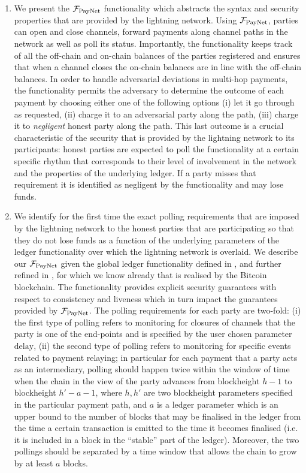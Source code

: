\begin{enumerate}
\item We present the $\mathcal{F}_{\mathrm{PayNet}}{}$ functionality which abstracts the syntax and
security properties that are provided by the lightning network. 
Using  $\mathcal{F}_{\mathrm{PayNet}}{}$, parties can open and close channels, forward
payments along channel paths in the network as well as poll its status. 
Importantly, the functionality keeps track of all the off-chain and on-chain
balances
of the  parties registered  and ensures that when a channel closes
the on-chain balances are in line with the off-chain balances.
In order to handle adversarial deviations in multi-hop payments, 
the functionality
permits the adversary to determine the outcome of each payment
by choosing either one of the following options (i) let it go through
as requested, (ii) charge it to an adversarial party along the path, 
(iii) charge it to {\em negligent } honest party along the path. 
This last outcome is a crucial  characteristic of the security
that is provided by the lightning network to its participants: 
honest parties are expected to poll the functionality at a certain 
specific rhythm that corresponds to their level of involvement in the network
and the properties of the underlying ledger. If a party misses that requirement
it is identified as negligent by the functionality and may lose funds. 

\item We identify for the first time 
the exact polling requirements that are imposed by the lightning
network to the honest parties that are participating so that they do not lose 
funds as a function of the underlying parameters of the ledger functionality
over which the lightning network is overlaid. 
We describe our  $\mathcal{F}_{\mathrm{PayNet}}{}$ given the global ledger functionality defined in 
\cite{BMTZ17}, and further refined in \cite{genesis}, for which we know already that is realised by the Bitcoin blockchain. The functionality provides explicit security guarantees with respect to consistency and liveness which in turn impact 
the guarantees provided by $\mathcal{F}_{\mathrm{PayNet}}{}$. The polling requirements for each party 
are  two-fold: (i) the first type of polling refers to monitoring for closures of channels that the party is one of the end-points and is specified by the 
user chosen parameter $\mathrm{delay}$, 
(ii) the second type of polling refers to monitoring for specific 
events related to payment relaying; in particular for each payment that a party acts as an intermediary,  polling should happen twice within the window of time when the chain in the view of the party advances  from blockheight  $h-1$
to blockheight $h'-a-1$, where $h,h'$ are two blockheight parameters specified  
in the particular payment path, and $a$ is a ledger parameter 
which is an upper bound to 
the number of blocks  that may be finalised in the ledger 
from the time a certain transaction is emitted to the time it becomes finalised
(i.e. it is included in a block in the ``stable''  part of the ledger). 
Moreover, the two pollings should be separated by a time window that allows
the chain to grow by at least $a$ blocks. 


\end{enumerate}
